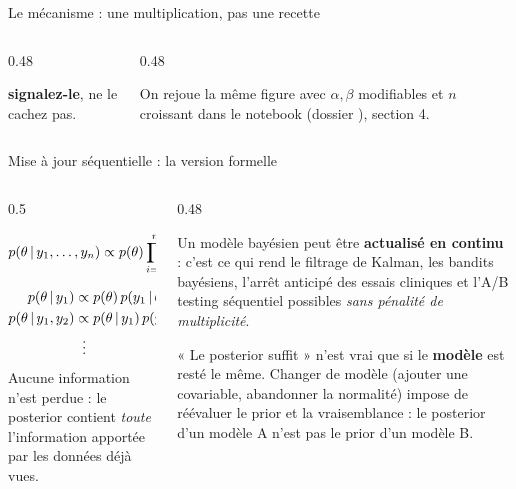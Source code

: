 \begin{frame}{Le mécanisme : une multiplication, pas une recette}
\begin{columns}[t]
\begin{column}{0.48\textwidth}
\begin{kbox}
\begin{itemize}
        \textbf{signalez-le}, ne le cachez pas.
\end{itemize}
\end{kbox}
\end{column}
\begin{column}{0.48\textwidth}
\begin{abox}
On rejoue la même figure avec $\alpha,\beta$ modifiables et
$n$ croissant dans le notebook
 (dossier ), section 4.
\end{abox}
\end{column}
\end{columns}
\end{frame}

\begin{frame}{Mise à jour séquentielle : la version formelle}
\begin{columns}[t]
\begin{column}{0.5\textwidth}
\begin{kbox}
\[
p(\theta \,\vert\, y_1,\dots,y_n) \propto p(\theta)\prod_{i=1}^{n}p(y_i \,\vert\, \theta)
\]
\end{kbox}
\begin{kbox}[Traitement en flux (= c'est pareil)]
\[
\begin{aligned}
p(\theta \,\vert\, y_1) &\propto p(\theta)\,p(y_1 \,\vert\, \theta)\\
p(\theta \,\vert\, y_1,y_2) &\propto p(\theta \,\vert\, y_1)\,p(y_2 \,\vert\, \theta)\\
&\;\;\vdots
\end{aligned}
\]
Aucune information n'est perdue : le posterior contient
\emph{toute} l'information apportée par les données déjà vues.
\end{kbox}
\end{column}
\begin{column}{0.48\textwidth}
\begin{ebox}
Un modèle bayésien peut être \textbf{actualisé en continu} : c'est ce qui
rend le filtrage de Kalman, les bandits bayésiens, l'arrêt anticipé des essais
cliniques et l'A/B testing séquentiel possibles \emph{sans pénalité de multiplicité}.
\end{ebox}
\begin{wbox}
« Le posterior suffit » n'est vrai que si le \textbf{modèle} est resté le même.
Changer de modèle (ajouter une covariable, abandonner la normalité) impose de
réévaluer le prior et la vraisemblance : le posterior d'un modèle A n'est
pas le prior d'un modèle B.
\end{wbox}
\end{column}
\end{columns}
\end{frame}

